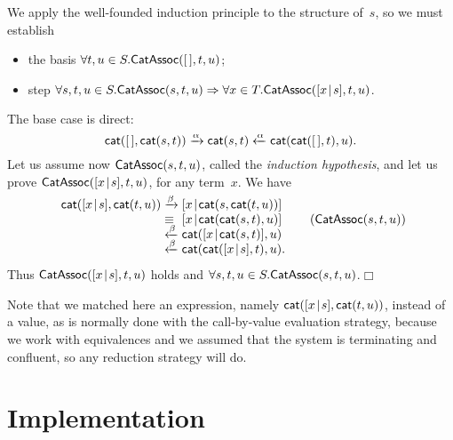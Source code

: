 We apply the well\hyp{}founded induction principle to the structure
of~\(s\), so we must establish
\begin{itemize}

  \item the basis \(\forall t,u \in S.\textsf{CatAssoc}({[\,],t,u})\);

  \item step \(\forall s,t,u \in S.\textsf{CatAssoc}({s,t,u})
    \Rightarrow \forall x \in T.\textsf{CatAssoc}({[{x}\!\mid\!{s}],t,u})\).

\end{itemize}
The base case is direct:
\begin{equation*}
  \fun{cat}(\el,\fun{cat}(s,t))
\xrightarrow{\smash{\alpha}} \fun{cat}(s,t)
\xleftarrow{\smash{\alpha}}
\fun{cat}(\fun{cat}(\el,t),u).
\index{cat@\fun{cat/2}}
\end{equation*}
Let us assume now \(\textsf{CatAssoc}({s,t,u})\), called the
\emph{induction hypothesis}, and
let us prove
\(\textsf{CatAssoc}({[{x}\!\mid\!{s}],t,u})\),
for any term~\(x\). We have
\begin{equation*}
\begin{array}{r@{\;}l@{\;}l@{\qquad}r@{}}
  \fun{cat}(\cons{x}{s},\fun{cat}(t,u))
& \xrightarrow{\smash\beta}
& \cons{x}{\fun{cat}(s,\fun{cat}(t,u))}\\
& \equiv
& \cons{x}{\fun{cat}(\fun{cat}(s,t),u)}
& (\pred{CatAssoc}{s,t,u})\\
& \xleftarrow{\smash\beta}
& \fun{cat}(\cons{x}{\fun{cat}(s,t)},u)\\
& \xleftarrow{\smash\beta}
& \fun{cat}(\fun{cat}(\cons{x}{s},t),u).\index{cat@\fun{cat/2}}
\end{array}
\end{equation*}
Thus
\(\textsf{CatAssoc}({[{x}\!\mid\!{s}],t,u})\) holds and \(\forall s,t,u \in
S.\textsf{CatAssoc}({s,t,u})\).\hfill\(\Box\)

Note that we matched here an expression, namely
\(\textsf{cat}([{x}\!\mid\!{s}],\textsf{cat}(t,u))\), instead of a value, as is
normally done with the call\hyp{}by\hyp{}value evaluation strategy,
because we work with equivalences and we assumed that the system is
terminating and confluent, so any reduction strategy will do.


\section{Implementation}
\label{sec:implementation}

